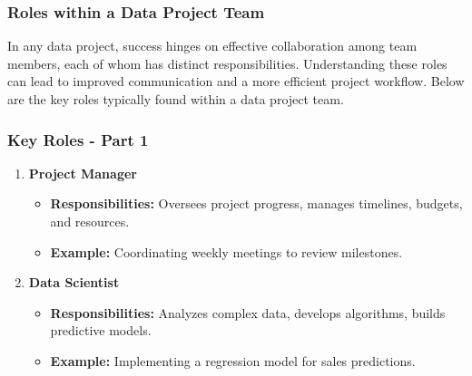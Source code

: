 \documentclass[aspectratio=169]{beamer}
\begin{document}
\begin{frame}[fragile]
    \frametitle{Roles within a Data Project Team}
    In any data project, success hinges on effective collaboration among team members, each of whom has distinct responsibilities. Understanding these roles can lead to improved communication and a more efficient project workflow. Below are the key roles typically found within a data project team.
\end{frame}

\begin{frame}[fragile]
    \frametitle{Key Roles - Part 1}
    \begin{enumerate}
        \item \textbf{Project Manager}
            \begin{itemize}
                \item \textbf{Responsibilities:} Oversees project progress, manages timelines, budgets, and resources.
                \item \textbf{Example:} Coordinating weekly meetings to review milestones.
            \end{itemize}
        
        \item \textbf{Data Scientist}
            \begin{itemize}
                \item \textbf{Responsibilities:} Analyzes complex data, develops algorithms, builds predictive models.
                \item \textbf{Example:} Implementing a regression model for sales predictions.
            \end{itemize}
    \end{enumerate}
\end{frame}
\end{document}
